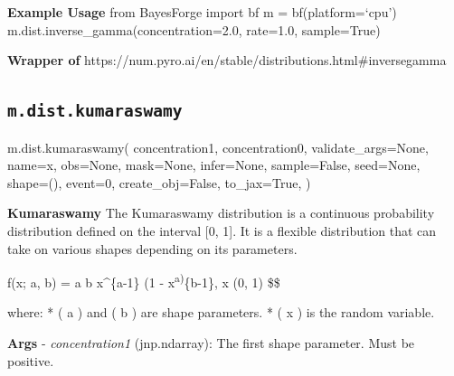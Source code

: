 \documentclass[
  letterpaper,
  DIV=11,
  numbers=noendperiod]{scrartcl}
\newenvironment{Shaded}{\begin{snugshade}}{\end{snugshade}}
\newcommand{\DecValTok}[1]{\textcolor[rgb]{0.68,0.00,0.00}{#1}}
\newcommand{\NormalTok}[1]{\textcolor[rgb]{0.00,0.23,0.31}{#1}}
\newcommand{\OperatorTok}[1]{\textcolor[rgb]{0.37,0.37,0.37}{#1}}
\newcommand{\StringTok}[1]{\textcolor[rgb]{0.13,0.47,0.30}{#1}}
\newcommand{\VariableTok}[1]{\textcolor[rgb]{0.07,0.07,0.07}{#1}}
\begin{document}
\textbf{Example Usage} from BayesForge import bf m = bf(platform=`cpu')
m.dist.inverse\_gamma(concentration=2.0, rate=1.0, sample=True)

\textbf{Wrapper of}
https://num.pyro.ai/en/stable/distributions.html\#inversegamma

\subsection{\texorpdfstring{\texttt{m.dist.kumaraswamy}}{m.dist.kumaraswamy}}\label{kumaraswamy}

\begin{Shaded}
\begin{Highlighting}[]
\NormalTok{m.dist.kumaraswamy(}
\NormalTok{    concentration1,}
\NormalTok{    concentration0,}
\NormalTok{    validate\_args}\OperatorTok{=}\VariableTok{None}\NormalTok{,}
\NormalTok{    name}\OperatorTok{=}\StringTok{\textquotesingle{}x\textquotesingle{}}\NormalTok{,}
\NormalTok{    obs}\OperatorTok{=}\VariableTok{None}\NormalTok{,}
\NormalTok{    mask}\OperatorTok{=}\VariableTok{None}\NormalTok{,}
\NormalTok{    infer}\OperatorTok{=}\VariableTok{None}\NormalTok{,}
\NormalTok{    sample}\OperatorTok{=}\VariableTok{False}\NormalTok{,}
\NormalTok{    seed}\OperatorTok{=}\VariableTok{None}\NormalTok{,}
\NormalTok{    shape}\OperatorTok{=}\NormalTok{(),}
\NormalTok{    event}\OperatorTok{=}\DecValTok{0}\NormalTok{,}
\NormalTok{    create\_obj}\OperatorTok{=}\VariableTok{False}\NormalTok{,}
\NormalTok{    to\_jax}\OperatorTok{=}\VariableTok{True}\NormalTok{,}
\NormalTok{)}
\end{Highlighting}
\end{Shaded}

\textbf{Kumaraswamy} The Kumaraswamy distribution is a continuous
probability distribution defined on the interval {[}0, 1{]}. It is a
flexible distribution that can take on various shapes depending on its
parameters.

\[
  \] f(x; a, b) = a b x\^{}\{a-1\} (1 - x\textsuperscript{a)}\{b-1\},
\quad x \in (0, 1) \$\$

where: * ( a ) and ( b ) are shape parameters. * ( x ) is the random
variable.

\textbf{Args} - \emph{concentration1} (jnp.ndarray): The first shape
parameter. Must be positive.
\end{document}
